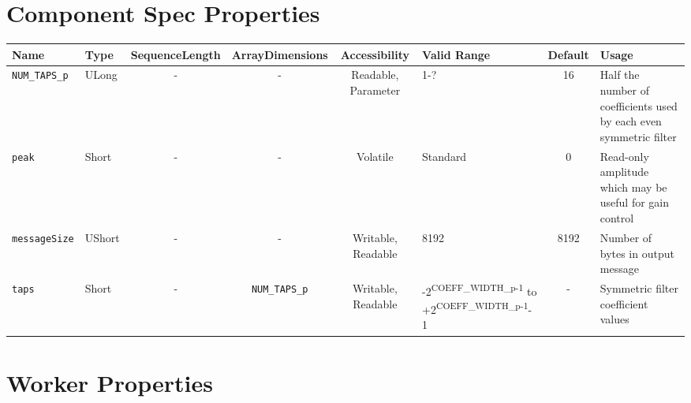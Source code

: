 \documentclass{article}
\begin{document}
\begin{landscape}
	\section*{Component Spec Properties}
	\begin{scriptsize}
		\begin{tabular}{|p{1.5cm}|p{1cm}|c|c|c|p{3cm}|c|p{7cm}|}
			\hline
			\rowcolor{blue}
			Name               & Type   & SequenceLength & ArrayDimensions   & Accessibility       & Valid Range                                                                      & Default & Usage                                                                        \\
			\hline
			\verb+NUM_TAPS_p+  & ULong  & -              & -                 & Readable, Parameter & 1-?                                                                              & 16      & Half the number of coefficients used by each           even symmetric filter \\
			\hline
			\verb+peak+        & Short  & -              & -                 & Volatile            & Standard                                                                         & 0       & Read-only amplitude which may be useful for gain control                     \\
			\hline
			\verb+messageSize+ & UShort & -              & -                 & Writable, Readable  & 8192                                                                             & 8192    & Number of bytes in output message                                            \\
			\hline
			\verb+taps+        & Short  & -              & \verb+NUM_TAPS_p+ & Writable, Readable  & -2\textsuperscript{COEFF\_WIDTH\_p-1} to +2\textsuperscript{COEFF\_WIDTH\_p-1}-1 & -       & Symmetric filter coefficient values                                          \\
			\hline
		\end{tabular}
	\end{scriptsize}

	\section*{Worker Properties}

\end{landscape}
\end{document}
